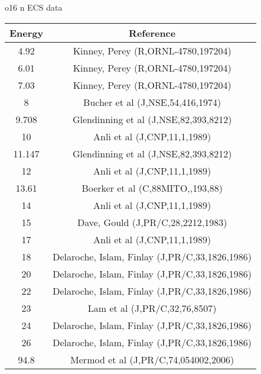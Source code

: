 \caption{o16 n ECS data}\begin{tabular}{|c||c|} 
 \hline 
\bf{Energy} & \bf{Reference} \\
 \hline
 \hline 
4.92 & Kinney, Perey (R,ORNL-4780,197204)\\
6.01 & Kinney, Perey (R,ORNL-4780,197204)\\
7.03 & Kinney, Perey (R,ORNL-4780,197204)\\
8 & Bucher et al (J,NSE,54,416,1974)\\
9.708 & Glendinning et al (J,NSE,82,393,8212)\\
10 & Anli et al (J,CNP,11,1,1989)\\
11.147 & Glendinning et al (J,NSE,82,393,8212)\\
12 & Anli et al (J,CNP,11,1,1989)\\
13.61 & Boerker et al (C,88MITO,,193,88)\\
14 & Anli et al (J,CNP,11,1,1989)\\
15 & Dave, Gould (J,PR/C,28,2212,1983)\\
17 & Anli et al (J,CNP,11,1,1989)\\
18 & Delaroche, Islam, Finlay (J,PR/C,33,1826,1986)\\
20 & Delaroche, Islam, Finlay (J,PR/C,33,1826,1986)\\
22 & Delaroche, Islam, Finlay (J,PR/C,33,1826,1986)\\
23 & Lam et al (J,PR/C,32,76,8507)\\
24 & Delaroche, Islam, Finlay (J,PR/C,33,1826,1986)\\
26 & Delaroche, Islam, Finlay (J,PR/C,33,1826,1986)\\
94.8 & Mermod et al (J,PR/C,74,054002,2006)\\
\end{tabular}